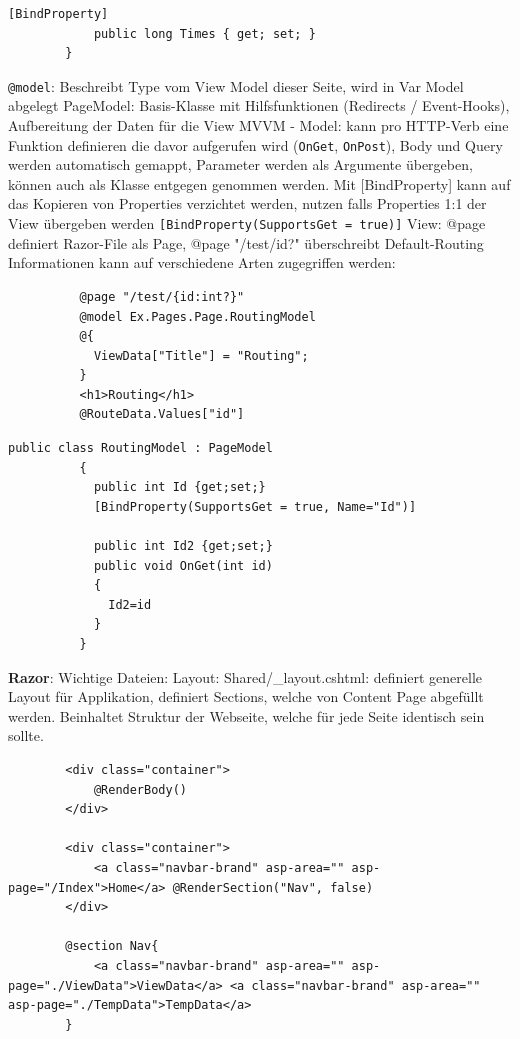 \documentclass[10pt,landscape]{article}
\begin{document}
\begin{multicols}{2}
\begin{lstlisting}[style=CSharp]
            [BindProperty]
            public long Times { get; set; }
        }
        \end{lstlisting}
        \lstinline{@model}: Beschreibt Type vom View Model dieser Seite, wird in Var Model abgelegt
        PageModel: Basis-Klasse mit Hilfsfunktionen (Redirects / Event-Hooks), Aufbereitung der Daten für die View
        MVVM - Model: kann pro HTTP-Verb eine Funktion definieren die davor aufgerufen wird (\lstinline{OnGet}, \lstinline{OnPost}), Body und Query werden automatisch gemappt, Parameter werden als Argumente übergeben, können auch als Klasse entgegen genommen werden.
        Mit [BindProperty] kann auf das Kopieren von Properties verzichtet werden, nutzen falls Properties 1:1 der View übergeben werden \lstinline{[BindProperty(SupportsGet = true)]}
        View: @page definiert Razor-File als Page, @page "/test/{id?}" überschreibt Default-Routing Informationen
        kann auf verschiedene Arten zugegriffen werden:
        \begin{lstlisting}
          @page "/test/{id:int?}"
          @model Ex.Pages.Page.RoutingModel
          @{
            ViewData["Title"] = "Routing";
          }
          <h1>Routing</h1>
          @RouteData.Values["id"]
        \end{lstlisting}\begin{lstlisting}[style=CSharp]
          public class RoutingModel : PageModel
          {
            public int Id {get;set;}
            [BindProperty(SupportsGet = true, Name="Id")]

            public int Id2 {get;set;}
            public void OnGet(int id)
            {
              Id2=id
            }
          }
        \end{lstlisting}

        \textbf{Razor}: Wichtige Dateien: Layout: Shared/\_layout.cshtml: definiert generelle Layout für Applikation, definiert Sections, welche von Content Page abgefüllt werden.
        Beinhaltet Struktur der Webseite, welche für jede Seite identisch sein sollte.

        \begin{lstlisting}
        <div class="container">
            @RenderBody()
        </div>

        <div class="container">
            <a class="navbar-brand" asp-area="" asp-page="/Index">Home</a> @RenderSection("Nav", false)
        </div>

        @section Nav{
            <a class="navbar-brand" asp-area="" asp-page="./ViewData">ViewData</a> <a class="navbar-brand" asp-area="" asp-page="./TempData">TempData</a>
        }
        \end{lstlisting}


\end{multicols}
\end{document}
